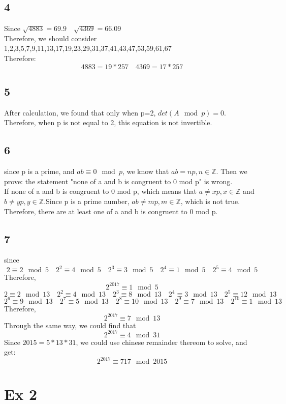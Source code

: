 \documentclass[a4paper,12pt]{journal}
\begin{document}
\subsection*{4}
Since $\sqrt{4883}=69.9\quad\sqrt{4369}=66.09$\\
Therefore, we should consider 1,2,3,5,7,9,11,13,17,19,23,29,31,37,41,43,47,53,59,61,67\\
Therefore:
$$4883=19*257\quad 4369=17*257$$
\subsection*{5}
After calculation, we found that only when p=2, $det(A\mod p)=0$. Therefore, when p is not equal to 2, this equation is not invertible.
\subsection*{6}
since p is a prime, and $ab\equiv 0 \mod p$, we know that $ab=np,n\in\mathbb{Z}$. Then we prove: the statement "none of a and b is congruent to 0 mod p" is wrong.\\
If none of a and b is congruent to 0 mod p, which means that $a\not =xp,x\in\mathbb{Z}$ and $b\not =yp,y\in\mathbb{Z}$.Since p is a prime number, $ab\not = mp,m\in\mathbb{Z}$, which is not true. Therefore, there are at least one of a and b is congruent to 0 mod p.\\
\subsection*{7}
since
$$2\equiv 2\mod 5\quad2^2\equiv 4\mod 5\quad2^3\equiv 3\mod 5\quad2^4\equiv 1\mod 5\quad2^5\equiv 4\mod 5$$
Therefore, $$2^{2017}\equiv 1\mod 5$$
$$2\equiv 2\mod 13\quad2^2\equiv 4\mod 13\quad2^3\equiv 8\mod 13\quad2^4\equiv 3\mod 13\quad2^5\equiv 12\mod 13$$
$$2^6\equiv 9\mod 13\quad2^7\equiv 5\mod 13\quad2^8\equiv 10\mod 13\quad2^9\equiv 7\mod 13\quad2^{10}\equiv 1\mod 13$$
Therefore, $$2^{2017}\equiv 7\mod 13$$
Through the same way, we could find that $$2^{2017}\equiv 4 \mod 31$$
Since $2015=5*13*31$, we could use chinese remainder thereom to solve, and get:
$$2^{2017}\equiv 717\mod 2015$$
\section*{Ex 2}
\end{document}
